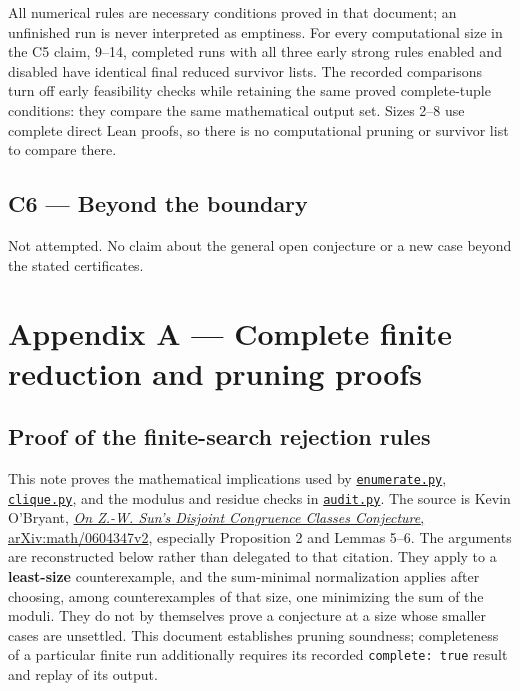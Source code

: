 \documentclass[11pt,a4paper]{article}
\begin{document}
All numerical rules are necessary conditions proved in that document; an unfinished run is never interpreted as emptiness. For every computational size in the C5 claim, 9--14, completed runs with all three early strong rules enabled and disabled have identical final reduced survivor lists. The recorded comparisons turn off early feasibility checks while retaining the same proved complete-tuple conditions: they compare the same mathematical output set. Sizes 2--8 use complete direct Lean proofs, so there is no computational pruning or survivor list to compare there.

\subsection{C6 --- Beyond the boundary}\label{c6-beyond-the-boundary}

Not attempted. No claim about the general open conjecture or a new case beyond the stated certificates.

\section{Appendix A --- Complete finite reduction and pruning proofs}\label{appendix-a-complete-finite-reduction-and-pruning-proofs}

\subsection{Proof of the finite-search rejection rules}\label{proof-of-the-finite-search-rejection-rules}

This note proves the mathematical implications used by \href{https://github.com/mpelteshki/climbing-to-the-frontier/blob/ed55f76eb8c558825bb629fd2cd8dbf46e5f1314/cagent/p4/audit/enumerate.py}{\texttt{enumerate.py}}, \href{https://github.com/mpelteshki/climbing-to-the-frontier/blob/ed55f76eb8c558825bb629fd2cd8dbf46e5f1314/cagent/p4/audit/clique.py}{\texttt{clique.py}}, and the modulus and residue checks in \href{https://github.com/mpelteshki/climbing-to-the-frontier/blob/ed55f76eb8c558825bb629fd2cd8dbf46e5f1314/cagent/p4/audit/audit.py}{\texttt{audit.py}}. The source is Kevin O'Bryant, \href{https://arxiv.org/pdf/math/0604347v2}{\emph{On Z.-W. Sun's Disjoint Congruence Classes Conjecture}, arXiv:math/0604347v2}, especially Proposition 2 and Lemmas 5--6. The arguments are reconstructed below rather than delegated to that citation. They apply to a \textbf{least-size} counterexample, and the sum-minimal normalization applies after choosing, among counterexamples of that size, one minimizing the sum of the moduli. They do not by themselves prove a conjecture at a size whose smaller cases are unsettled. This document establishes pruning soundness; completeness of a particular finite run additionally requires its recorded \texttt{complete:\ true} result and replay of its output.
\end{document}
